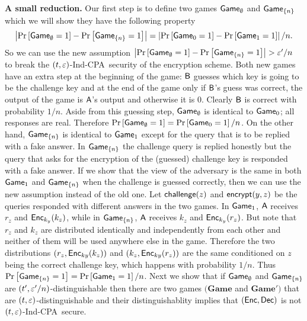 \documentclass{article}
\newcommand{\tcpa}{$(t,\eps)$-Ind-CPA}
\def\B{{\sf B}}
\def\A{{\sf A}}
\newcommand{\encrypt}{{\sf encrypt}}
\newcommand{\game}{{\sf Game}}
\newcommand{\dgame}{{\mathbf{Game}}}
\def\challenge{{\sf challenge}}
\begin{document}
  \textbf{A small reduction.} Our first step is to define two games $\game_{\emptyset}$ and $\game_{\{n\}}$ which we will show they have the following property 
\[\abs{\prob{\game_{\emptyset}=1}-\prob{\game_{\{n\}}=1}}=\abs{\prob{\game_0=1}-\prob{\game_1=1}}/n. \]
  So we can use the new assumption $\abs{\prob{\game_{\emptyset}=1}-\prob{\game_{\{n\}}=1}} > \eps'/n$ to break the \tcpa~security of the encryption scheme. Both new games have an extra step at the beginning of the game: $\B$ guesses which key is going to be the challenge key and at the end of the game only if $\B$'s guess was correct, the output of the game is $\A$'s output and otherwise it is 0. Clearly $\B$ is correct with probability $1/n$. Aside from this guessing step, $\game_{\emptyset}$ is identical to $\game_0$; all responses are real. Therefore $\prob{\game_{\emptyset}=1}= \prob{\game_0=1}/n$. On the other hand, $\game_{\{n\}}$ is identical to $\game_1$ except for the query that is to be replied with a fake answer. In $\game_{\{n\}}$ the challenge query is replied honestly but the query that asks for the encryption of the (guessed) challenge key is responded with a fake answer. If we show that the view of the adversary is the same in both $\game_1$ and $\game_{\{n\}}$ when the challenge is guessed correctly, then we can use the new assumption instead of the old one. Let $\challenge(z)$ and $\encrypt(y,z)$ be the queries responded with different answers in the two games.  In $\game_{1}$, $\A$ receives $r_z$ and ${\sf Enc}_{k_{y}}(k_z)$, while in $\game_{\cub{n}}$, $\A$ receives $k_z$ and ${\sf Enc}_{k_y}(r_z)$. But note that $r_z$ and $k_z$ are distributed identically and independently from each other and neither of them will be used anywhere else in the game. Therefore the two distributions $(r_z,{\sf Enc}_{k{y}}(k_z))$ and $(k_z,{\sf Enc}_{k{y}}(r_z))$ are the same conditioned on $z$ being the correct challenge key, which happens with probability $1/n$. Thus $\prob{\game_{\{n\}}=1}= \prob{\game_1=1}/n$. Next we show that if $\game_{\emptyset}$ and $\game_{\cub{n}}$ are $(t',\varepsilon'/n)$-distinguishable then there are two games $(\dgame$ and $\dgame')$ that are $(t,\varepsilon)$-distinguishable and their distinguishablity implies that $({\sf Enc},{\sf Dec})$ is not \tcpa~secure.\\ 
\end{document}
